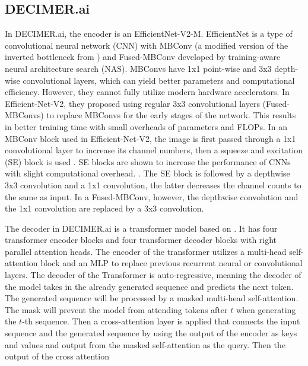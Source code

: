 \documentclass[conference]{IEEEtran}
\begin{document}
\subsection{DECIMER.ai}
In DECIMER.ai, the encoder is an EfficientNet-V2-M. EfficientNet is a type of convolutional neural network (CNN) with MBConv \cite{tan_efficientnet:_2020} (a modified version of the inverted bottleneck from \cite{mobilenet}) and Fused-MBConv \cite{suyog_efficientnet-edgetpu:_2019} developed by training-aware neural architecture search (NAS). \cite{swin_tran} \cite{effv2} MBConvs have 1x1 point-wise and 3x3 depth-wise convolutional layers, which can yield better parameters and computational efficiency. \cite{mobilenet} \cite{effv2} However, they cannot fully utilize modern hardware accelerators. In Efficient-Net-V2, they proposed using regular 3x3 convolutional layers (Fused-MBConvs) to replace MBConvs for the early stages of the network. This results in better training time with small overheads of parameters and FLOPs. In an MBConv block used in Efficient-Net-V2, the image is first passed through a 1x1 convolutional layer to increase its channel numbers, then a squeeze and excitation (SE) block is used \cite{hu_squeeze-and-excitation_2019}\cite{tan_efficientnet:_2020}. SE blocks are shown to increase the performance of CNNs with slight computational overhead. \cite{hu_squeeze-and-excitation_2019}. The SE block is followed by a depthwise 3x3 convolution and a 1x1 convolution, the latter decreases the channel counts to the same as input. In a Fused-MBConv, however, the depthwise convolution and the 1x1 convolution are replaced by a 3x3 convolution. \cite{effv2} \cite{mobilenet}

The decoder in DECIMER.ai is a transformer model based on \cite{attention_is_all_you_need}. It has four transformer encoder blocks and four transformer decoder blocks with right parallel attention heads. \cite{decimer} The encoder of the transformer utilizes a multi-head self-attention block and an MLP to replace previous recurrent neural or convolutional layers. The decoder of the Transformer is auto-regressive, meaning the decoder of the model takes in the already generated sequence and predicts the next token. The generated sequence will be processed by a masked multi-head self-attention. The mask will prevent the model from attending tokens after $t$ when generating the $t$-th sequence. Then a cross-attention layer is applied that connects the input sequence and the generated sequence by using the output of the encoder as keys and values and output from the masked self-attention as the query. Then the output of the cross attention 
\end{document}
